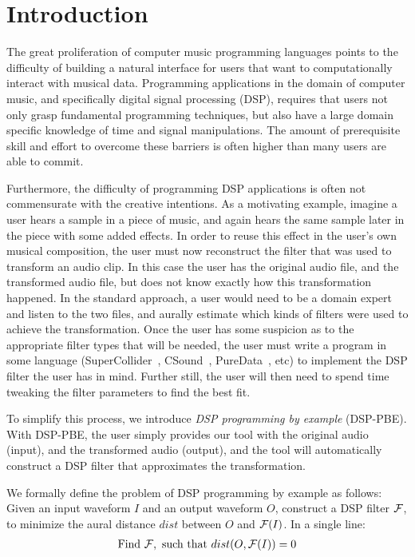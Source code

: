 \section{Introduction}

The great proliferation of computer music programming languages points to the difficulty of building a natural interface for users that want to computationally interact with musical data.
Programming applications in the domain of computer music, and specifically digital signal processing (DSP), requires that users not only grasp fundamental programming techniques, but also have a large domain specific knowledge of time and signal manipulations.
The amount of prerequisite skill and effort to overcome these barriers is often higher than many users are able to commit.

Furthermore, the difficulty of programming DSP applications is often not commensurate with the creative intentions. 
As a motivating example, imagine a user hears a sample in a piece of music, and again hears the same sample later in the piece with some added effects.
In order to reuse this effect in the user's own musical composition, the user must now reconstruct the filter that was used to transform an audio clip. 
In this case the user has the original audio file, and the transformed audio file, but does not know exactly how this transformation happened.
In the standard approach, a user would need to be a domain expert and listen to the two files, and aurally estimate which kinds of filters were used to achieve the transformation. 
Once the user has some suspicion as to the appropriate filter types that will be needed, the user must write a program in some language (SuperCollider~\cite{supercollider}, CSound~\cite{csound}, PureData~\cite{puredata}, etc) to implement the DSP filter the user has in mind. 
Further still, the user will then need to spend time tweaking the filter parameters to find the best fit. 


To simplify this process, we introduce \textit{DSP programming by example} (DSP-PBE). 
With DSP-PBE, the user simply provides our tool with the original audio (input), and the transformed audio (output), and the tool will automatically construct a DSP filter that approximates the transformation.

We formally define the problem of DSP programming by example as follows:
Given an input waveform $I$ and an output waveform $O$, construct a DSP filter $\mathcal{F}$, to minimize the aural distance $dist$ between $O$ and $\mathcal{F}(I)$.
In a single line:
%
\begin{align*}
\text{Find } \mathcal{F}, \text{ such that } dist(O,\mathcal{F}(I))=0
\end{align*}


